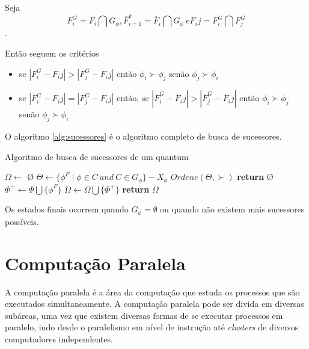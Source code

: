 \documentclass{ufsc-thesis}
\begin{document}
Seja $$F_{i}^{G} = F_i \bigcap G_\phi, 
\overline{F}_{i=1}^{k} = \overline{F}_i \bigcap G_\phi\ e 
F_ij = F_{i}^{G} \bigcap F_{j}^{G}$$.

\noindent Então seguem os critérios

\begin{itemize}
  \item se $|F_{i}^{G} - F_ij| > |F_{j}^{G} - F_ij|$ então 
  $\phi_i \succ \phi_j$ senão $\phi_j \succ \phi_i$
  \item se $|F_{i}^{G} - F_ij| = |F_{j}^{G} - F_ij|$ então, 
  se $|\overline{F}_{i}^{G} - \overline{F}_ij| > |\overline{F}_{j}^{G} - \overline{F}_ij|$ 
  então $\phi_i \succ \phi_j$ senão $\phi_j \succ \phi_i$
\end{itemize}

O algoritmo \ref{alg:sucessores} é o algoritmo completo de busca de sucessores.

\begin{algorithm}[H]
\caption{Algoritmo de busca de sucessores de um quantum}\label{alg:sucessores}
\begin{algorithmic}[1]
\State$\Omega \gets$ \O {}
\State$\Theta \gets \{\phi^F \mid \phi \in C\ and\ C \in G_\phi \} - X_\phi$
\State$Ordene(\Theta, \succ)$ 
    \State \textbf{return} \O
\EndIf
{}
    \State$\Phi^+ \gets \Phi \bigcup \{\phi^F\} $
        \State $\Omega \gets \Omega \bigcup \{ \Phi^+ \}$
    \EndIf
\EndFor
\State \textbf{return} $\Omega$
\EndProcedure
\end{algorithmic}
\end{algorithm}

Os estados finais ocorrem quando $G_\phi = \emptyset$ ou quando não existem mais 
sucessores possíveis.

\section{Computação Paralela}
\label{sec:parallel}

A computação paralela é a área da computação que estuda os processos 
que são executados simultaneamente. A computação paralela pode ser divida 
em diversas subáreas, uma vez que existem diversas formas de se executar 
processos em paralelo, indo desde o paralelismo em nível de instrução\cite{Rau2003} 
até \textit{clusters} de diversos computadores independentes\cite{Coulouris2011}.
\end{document}
